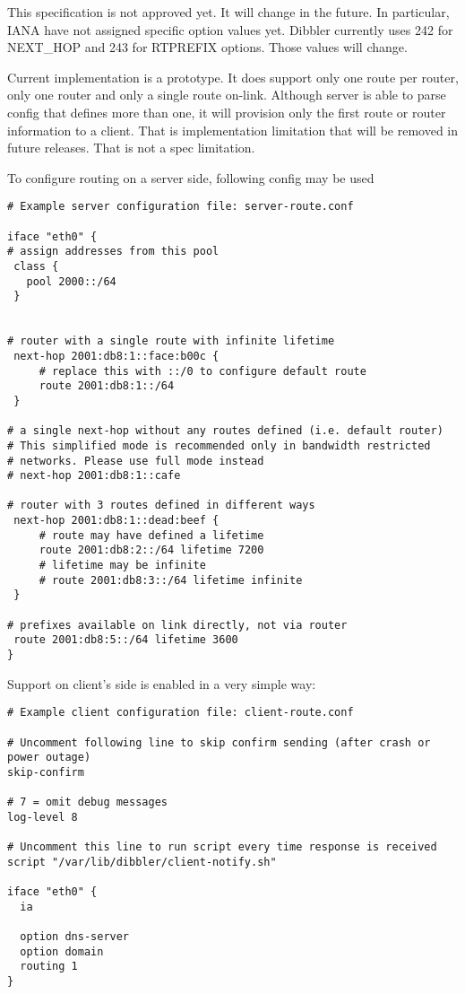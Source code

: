 \Note This specification is not approved yet. It will change in the
future. In particular, IANA have not assigned specific option values
yet. Dibbler currently uses 242 for NEXT\_HOP and 243 for RTPREFIX
options. Those values will change.

\Note Current implementation is a prototype. It does support only one
route per router, only one router and only a single route
on-link. Although server is able to parse config that defines more
than one, it will provision only the first route or router information
to a client. That is implementation limitation that will be removed in
future releases. That is not a spec limitation.

To configure routing on a server side, following config may be used
\begin{lstlisting}
# Example server configuration file: server-route.conf

iface "eth0" {
# assign addresses from this pool
 class {
   pool 2000::/64
 }


# router with a single route with infinite lifetime
 next-hop 2001:db8:1::face:b00c {
     # replace this with ::/0 to configure default route
     route 2001:db8:1::/64
 }

# a single next-hop without any routes defined (i.e. default router)
# This simplified mode is recommended only in bandwidth restricted
# networks. Please use full mode instead
# next-hop 2001:db8:1::cafe

# router with 3 routes defined in different ways
 next-hop 2001:db8:1::dead:beef {
     # route may have defined a lifetime
     route 2001:db8:2::/64 lifetime 7200
     # lifetime may be infinite
     # route 2001:db8:3::/64 lifetime infinite
 }

# prefixes available on link directly, not via router
 route 2001:db8:5::/64 lifetime 3600
}
\end{lstlisting}

Support on client's side is enabled in a very simple way:
\begin{lstlisting}
# Example client configuration file: client-route.conf

# Uncomment following line to skip confirm sending (after crash or power outage)
skip-confirm

# 7 = omit debug messages
log-level 8

# Uncomment this line to run script every time response is received
script "/var/lib/dibbler/client-notify.sh"

iface "eth0" {
  ia

  option dns-server
  option domain
  routing 1
}
\end{lstlisting}

